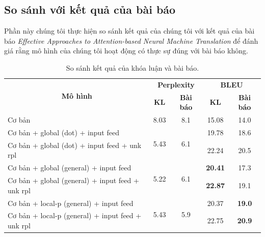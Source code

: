 \subsection{So sánh với kết quả của bài báo}
Phần này chúng tôi thực hiện so sánh kết quả của chúng tôi với kết quả của bài báo \textit{Effective Approaches to Attention-based Neural Machine Translation} \cite{attentionThangLuong2015} để đánh giá rằng mô hình của chúng tôi hoạt động có thực sự đúng với bài báo không.

\begin{table}
	\centering
	\caption{So sánh kết quả của khóa luận và bài báo.}
	\begin{tabular}{|l|c|c|c|c|} 
		\hline
		\multicolumn{1}{|c|}{\multirow{2}{*}{\textbf{Mô hình} }} & \multicolumn{2}{c|}{\textbf{Perplexity }}    & \multicolumn{2}{c|}{\textbf{BLEU }}  \\ 
		\cline{2-5}
		\multicolumn{1}{|c|}{}                                   & \textbf{KL}           & \textbf{Bài báo}     & \textbf{KL}    & \textbf{Bài báo}    \\ 
		\hline
		Cơ bản                                                   & 8.03                  & 8.1                  & 15.08          & 14.0                \\ 
		\hline
		Cơ bản + global (dot) + input feed                       & \multirow{2}{*}{5.43} & \multirow{2}{*}{6.1} & 19.78          & 18.6                \\ 
		\cline{1-1}\cline{4-5}
		Cơ bản + global (dot) + input feed + unk rpl             &                       &                      & 22.24          & 20.5                \\ 
		\hline
		Cơ bản + global (general) + input feed                   & \multirow{2}{*}{5.22} & \multirow{2}{*}{6.1} & \textbf{20.41} & 17.3                \\ 
		\cline{1-1}\cline{4-5}
		Cơ bản + global (general) + input feed + unk rpl         &                       &                      & \textbf{22.87} & 19.1                \\ 
		\hline
		Cơ bản + local-p (general) + input feed                  & \multirow{2}{*}{5.43} & \multirow{2}{*}{5.9} & 20.37          & \textbf{19.0}       \\ 
		\cline{1-1}\cline{4-5}
		Cơ bản + local-p (general) + input feed + unk rpl        &                       &                      & 22.75          & \textbf{20.9}       \\
		\hline
	\end{tabular}
	\label{tab_thesis-paper}
\end{table}


